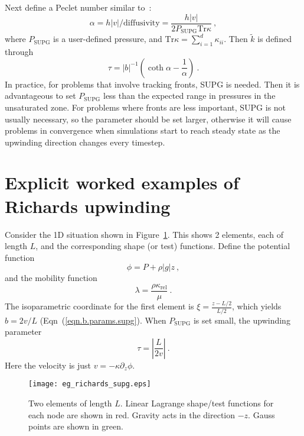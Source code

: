 \documentclass[]{scrreprt}
\begin{document}
Next define a Peclet number similar to~\cite{hughesET1986}:
\begin{equation}
\alpha = h|v|/\mathrm{diffusivity} =
\frac{h|v|}{2P_{\mathrm{SUPG}}\mbox{Tr}\kappa}
\ ,
\end{equation}
where $P_{\mathrm{SUPG}}$ is a user-defined pressure, and
$\mbox{Tr}\kappa = \sum_{i=1}^{d}\kappa_{ii}$.  Then $\tilde{k}$ is
defined through
\begin{equation}
\tau = |b|^{-1} \left( \coth\alpha - \frac{1}{\alpha}\right) \ .
\end{equation}
In practice, for problems that involve tracking fronts, SUPG is
needed.  Then it is advantageous to set $P_{\mathrm{SUPG}}$ less than
the expected range in pressures in the unsaturated zone.  For problems
where fronts are less important, SUPG is not usually necessary, so the
parameter should be set larger, otherwise it will cause problems in
convergence when simulations start to reach steady state as the upwinding direction changes every timestep.



\section{Explicit worked examples of Richards upwinding}

Consider the 1D situation shown in Figure~\ref{eg_richards_supg.fig}.
This shows 2 elements, each of length $L$, and the corresponding shape
(or test) functions.  Define the potential function
\begin{equation}
\phi = P + \rho|g|z \ ,
\end{equation}
and the mobility function
\begin{equation}
\lambda = \frac{\rho \kappa_{\mathrm{rel}}}{\mu} \ .
\end{equation}
The isoparametric coordinate for the first element is $\xi =
\frac{z-L/2}{L/2}$, which yields $b=2v/L$
(Eqn~(\ref{eqn.b.params.supg}).  When $P_{\mathrm{SUPG}}$ is set
small, the upwinding parameter 
\begin{equation}
\tau = \left|\frac{L}{2v}\right| \ .
\end{equation}
Here the velocity is just $v = -\kappa \partial_{z}\phi$.

\begin{figure}[htb]
\centering
\texttt{[image: eg\_richards\_supg.eps]}
\caption{Two elements of length $L$.  Linear Lagrange shape/test
  functions for each node are shown in red.  Gravity acts in the
  direction $-z$.  Gauss points are shown in green.}
\label{eg_richards_supg.fig}
\end{figure}
\end{document}
